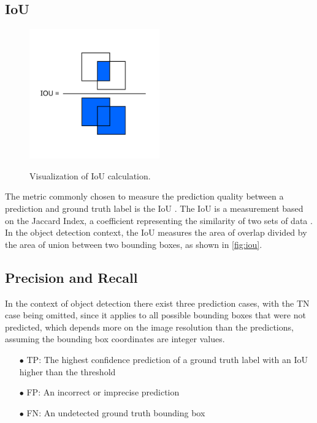 \documentclass[10pt]{book}
\newcommand{\figureref}[1]{\autoref{#1}}
\begin{document}
\subsection{IoU}

\begin{figure}
  \caption{Visualization of \ac{IoU} calculation.}
  \includegraphics[width=0.5\textwidth]{image/iou}
  \label{fig:iou}
\end{figure}

The metric commonly chosen to measure the prediction quality between a prediction and ground truth label is the \ac{IoU} \cite{padilla2020survey}. The \ac{IoU} is a measurement based on the Jaccard Index, a coefficient representing the similarity of two sets of data \cite{jaccard1901etude}. In the object detection context, the \ac{IoU} measures the area of overlap divided by the area of union between two bounding boxes, as shown in \figureref{fig:iou}.

\subsection{Precision and Recall}

In the context of object detection there exist three prediction cases, with the \ac{TN} case being omitted, since it applies to all possible bounding boxes that were not predicted, which depends more on the image resolution than the predictions, assuming the bounding box coordinates are integer values.

\begin{itemize}
  \item[$\bullet$] \ac{TP}: The highest confidence prediction of a ground truth label with an \ac{IoU} higher than the threshold
  \item[$\bullet$] \ac{FP}: An incorrect or imprecise prediction
  \item[$\bullet$] \ac{FN}: An undetected ground truth bounding box
\end{itemize}
\end{document}
